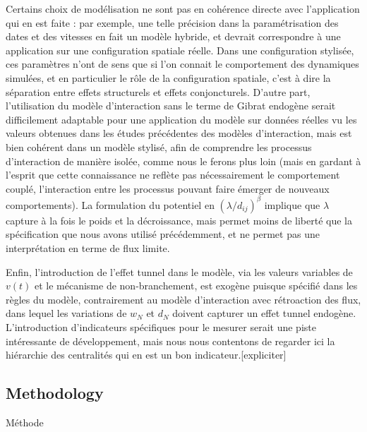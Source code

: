 Certains choix de modélisation ne sont pas en cohérence directe avec l'application qui en est faite : par exemple, une telle précision dans la paramétrisation des dates et des vitesses en fait un modèle hybride, et devrait correspondre à une application sur une configuration spatiale réelle. Dans une configuration stylisée, ces paramètres n'ont de sens que si l'on connait le comportement des dynamiques simulées, et en particulier le rôle de la configuration spatiale, c'est à dire la séparation entre effets structurels et effets conjoncturels. D'autre part, l'utilisation du modèle d'interaction sans le terme de Gibrat endogène serait difficilement adaptable pour une application du modèle sur données réelles vu les valeurs obtenues dans les études précédentes des modèles d'interaction, mais est bien cohérent dans un modèle stylisé, afin de comprendre les processus d'interaction de manière isolée, comme nous le ferons plus loin (mais en gardant à l'esprit que cette connaissance ne reflète pas nécessairement le comportement couplé, l'interaction entre les processus pouvant faire émerger de nouveaux comportements). La formulation du potentiel en $(\lambda / d_{ij})^\beta$  implique que $\lambda$ capture à la fois le poids et la décroissance, mais permet moins de liberté que la spécification que nous avons utilisé précédemment, et ne permet pas une interprétation en terme de flux limite.

Enfin, l'introduction de l'effet tunnel dans le modèle, via les valeurs variables de $v(t)$ et le mécanisme de non-branchement, est exogène puisque spécifié dans les règles du modèle, contrairement au modèle d'interaction avec rétroaction des flux, dans lequel les variations de $w_N$ et $d_N$ doivent capturer un effet tunnel endogène. L'introduction d'indicateurs spécifiques pour le mesurer serait une piste intéressante de développement, mais nous nous contentons de regarder ici la hiérarchie des centralités qui en est un bon indicateur.[expliciter]



\subsection{Methodology}{Méthode}

